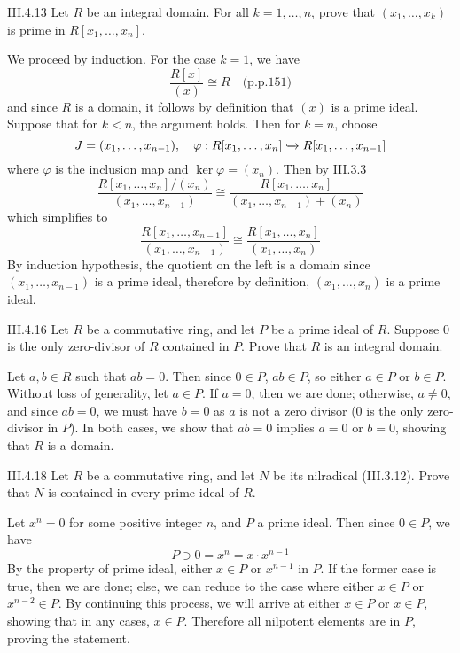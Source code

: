 \begin{problem}{III.4.13}
Let $R$ be an integral domain. For all $k = 1,\dotsc, n$, prove that $(x_1,\dotsc, x_k)$ is prime in $R[x_1,\dotsc, x_n]$.
\end{problem}
\begin{pf}
We proceed by induction. For the case $k = 1$, we have
\[
\frac{R[x]}{(x)} \cong R	\quad \text{(p.p.151)}
\]
and since $R$ is a domain, it follows by definition that $(x)$ is a prime ideal. Suppose that for $k < n$, the argument holds. Then for $k = n$, choose
\[
J = (x_1,\dotsc,x_{n-1}), \quad \varphi : R[x_1,\dotsc,x_{n}] \xhookrightarrow{} R[x_1,\dotsc,x_{n-1}]
\]
where $\varphi$ is the inclusion map and $\ker \varphi = (x_n)$. Then by III.3.3
\[
\frac{R[x_1,\dotsc,x_{n}]/(x_n)}{(x_1,\dotsc,x_{n-1})} \cong \frac{R[x_1,\dotsc,x_{n}]}{(x_1,\dotsc,x_{n-1})+(x_n)}
\]
which simplifies to
\[
\frac{R[x_1,\dotsc,x_{n-1}]}{(x_1,\dotsc,x_{n-1})} \cong \frac{R[x_1,\dotsc,x_{n}]}{(x_1,\dotsc,x_n)}	
\]
By induction hypothesis, the quotient on the left is a domain since $(x_1,\dotsc,x_{n-1})$ is a prime ideal, therefore by definition, $(x_1,\dotsc,x_n)$ is a prime ideal.
\end{pf}


\begin{problem}{III.4.16}
Let $R$ be a commutative ring, and let $P$ be a prime ideal of $R$. Suppose $0$ is the only zero-divisor of $R$ contained in $P$. Prove that $R$ is an integral domain. 
\end{problem}
\begin{pf}
Let $a,b \in R$ such that $ab = 0$. Then since $0 \in P$, $ab \in P$, so either $a\in P$ or $b \in P$. Without loss of generality, let $a \in P$. If $a = 0$, then we are done; otherwise, $a \neq 0$, and since $ab = 0$, we must have $b = 0$ as $a$ is not a zero divisor ($0$ is the only zero-divisor in $P$). In both cases, we show that $ab = 0$ implies $a = 0$ or $b = 0$, showing that $R$ is a domain.
\end{pf}

\begin{problem}{III.4.18}
Let $R$ be a commutative ring, and let $N$ be its nilradical (III.3.12). Prove that $N$ is contained in every prime ideal of $R$.
\end{problem}
\begin{pf}
Let $x^n = 0$ for some positive integer $n$, and $P$ a prime ideal. Then since $0 \in P$, we have
\[
P \ni 0 = x^n = x \cdot x^{n-1}
\]
By the property of prime ideal, either $x \in P$ or $x^{n-1}$ in $P$. If the former case is true, then we are done; else, we can reduce to the case where either $x \in P$ or $x^{n-2} \in P$. By continuing this process, we will arrive at either $x \in P$ or $x \in P$, showing that in any cases, $x \in P$. Therefore all nilpotent elements are in $P$, proving the statement. 
\end{pf}

